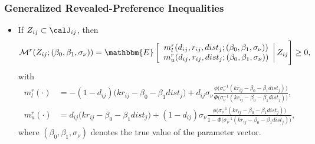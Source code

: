 \begin{frame}[label=revpref]
\frametitle{Generalized Revealed-Preference Inequalities}

\begin{itemize}
	\item If $Z_{ij}\subset\calJ_{ij}$, then
	\footnotesize
	\begin{align*}
	\mathcal{M}^{r}(Z_{ij};(\beta_{0},\beta_{1},\sigma_{\nu}))=\mathbbm{E}
	\left[
	\begin{array}{c}
	m^{r}_{l}(d_{ij},r_{ij},dist_{j};(\beta_{0},\beta_{1},\sigma_{\nu}))\\
	m^{r}_{u}(d_{ij},r_{ij},dist_{j};(\beta_{0},\beta_{1},\sigma_{\nu}))\\
	\end{array}\right|
	Z_{ij}
	\Bigg]\geq0,
	\end{align*}
	with
	\begin{align*}
	m^{r}_{l}(\cdot)&=-(1-d_{ij})\big(kr_{ij}-\beta_{0}-\beta_{1}dist_{j}\big)+d_{ij}\sigma_{\nu}\frac{\phi\big(\sigma_{\nu}^{-1}(kr_{ij}-\beta_{0}-\beta_{1}dist_{j})\big)}{\Phi\big(\sigma_{\nu}^{-1}(kr_{ij}-\beta_{0}-\beta_{1}dist_{j})\big)},\\
	m^{r}_{u}(\cdot)&=d_{ij}\big(kr_{ij}-\beta_{0}-\beta_{1}dist_{j}\big)+(1-d_{ij})\sigma_{\nu}\frac{\phi\big(\sigma_{\nu}^{-1}(kr_{ij}-\beta_{0}-\beta_{1}dist_{j})\big)}{1-\Phi\big(\sigma_{\nu}^{-1}(kr_{ij}-\beta_{0}-\beta_{1}dist_{j})\big)},
	\end{align*}
	\normalsize
	where $(\beta_{0},\beta_{1},\sigma_{\nu})$ denotes the true value of the parameter vector.
\end{itemize}
\end{frame}


